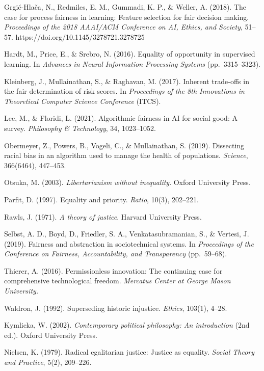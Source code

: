 Grgić-Hlača, N., Redmiles, E. M., Gummadi, K. P., \& Weller, A. (2018).
The case for process fairness in learning: Feature selection for fair
decision making. \emph{Proceedings of the 2018 AAAI/ACM Conference on
AI, Ethics, and Society}, 51--57.
https://doi.org/10.1145/3278721.3278725

Hardt, M., Price, E., \& Srebro, N. (2016). Equality of opportunity in
supervised learning. In \emph{Advances in Neural Information Processing
Systems} (pp.~3315--3323).

Kleinberg, J., Mullainathan, S., \& Raghavan, M. (2017). Inherent
trade-offs in the fair determination of risk scores. In
\emph{Proceedings of the 8th Innovations in Theoretical Computer Science
Conference} (ITCS).

Lee, M., \& Floridi, L. (2021). Algorithmic fairness in AI for social
good: A survey. \emph{Philosophy \& Technology}, 34, 1023--1052.

Obermeyer, Z., Powers, B., Vogeli, C., \& Mullainathan, S. (2019).
Dissecting racial bias in an algorithm used to manage the health of
populations. \emph{Science}, 366(6464), 447--453.

Otsuka, M. (2003). \emph{Libertarianism without inequality}. Oxford
University Press.

Parfit, D. (1997). Equality and priority. \emph{Ratio}, 10(3), 202--221.

Rawls, J. (1971). \emph{A theory of justice}. Harvard University Press.

Selbst, A. D., Boyd, D., Friedler, S. A., Venkatasubramanian, S., \&
Vertesi, J. (2019). Fairness and abstraction in sociotechnical systems.
In \emph{Proceedings of the Conference on Fairness, Accountability, and
Transparency} (pp.~59--68).

Thierer, A. (2016). Permissionless innovation: The continuing case for
comprehensive technological freedom. \emph{Mercatus Center at George
Mason University.}

Waldron, J. (1992). Superseding historic injustice. \emph{Ethics},
103(1), 4--28.

Kymlicka, W. (2002). \emph{Contemporary political philosophy: An
introduction} (2nd ed.). Oxford University Press.

Nielsen, K. (1979). Radical egalitarian justice: Justice as equality.
\emph{Social Theory and Practice}, 5(2), 209--226.
